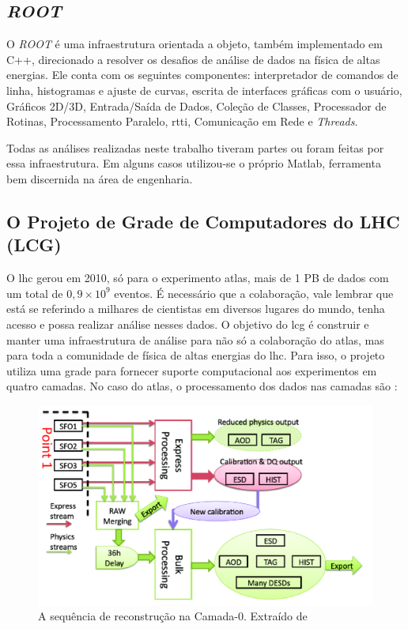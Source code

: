 \subsection{\emph{ROOT}}
\label{ssec:root}


O \emph{ROOT} é uma infraestrutura orientada a objeto, também implementado em C++, 
direcionado a resolver os desafios de análise de dados na física de altas 
energias. Ele conta com os seguintes componentes: interpretador de comandos 
de linha, histogramas e ajuste de curvas, escrita de interfaces gráficas com 
o usuário, Gráficos 2D/3D, Entrada/Saída de Dados, Coleção de Classes, 
Processador de Rotinas, Processamento Paralelo, \gls{rtti}, Comunicação em
Rede e \emph{Threads}.

Todas as análises realizadas neste trabalho tiveram partes ou foram feitas por essa
infraestrutura. Em alguns casos utilizou-se o próprio Matlab, ferramenta bem
discernida na área de engenharia.

\subsection{O Projeto de Grade de Computadores do LHC (LCG)}
\label{ssec:lcg}

O \gls{lhc} gerou em 2010, só para o experimento \gls{atlas}, mais de 1 PB de dados
com um total de $0,9 \times 10^9$ eventos. É necessário que a colaboração, 
vale lembrar que está se referindo a milhares de cientistas em diversos lugares
do mundo, tenha acesso e possa realizar análise nesses dados. 
O objetivo do \gls{lcg} é construir e manter uma 
infraestrutura de análise para não só a colaboração do \gls{atlas}, mas para toda 
a comunidade de física de altas energias do \gls{lhc}.
Para isso, o projeto utiliza uma grade para fornecer suporte computacional 
aos experimentos em quatro camadas. No caso do \gls{atlas}, o processamento dos
dados nas camadas são \cite{grid,atlas_computing_tdr,tier0_reconstruction_atlas}:

\begin{figure}[h!t]
\centering
\includegraphics[width=\textwidth]{imagens/tier0_stream.png}
\caption[A sequência de reconstrução na Camada-0]{A sequência de reconstrução na Camada-0. Extraído de
\cite{tier0_reconstruction_atlas}}
\label{fig:tier0_stream}
\end{figure}

